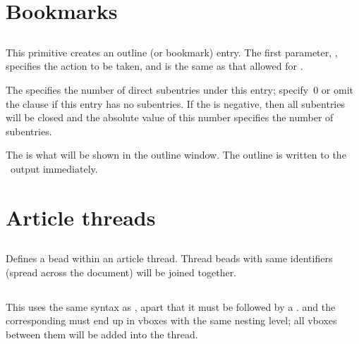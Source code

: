 \documentclass{pdftexmanual}
\begin{document}
\section{Bookmarks}

\subsection{}

This primitive creates an outline (or bookmark) entry. The first
parameter, , specifies the action to be taken, and
is the same as that allowed for \type{\pdfstartlink}.

The   specifies the number of direct
subentries under this entry; specify~0 or omit the clause if this entry
has no subentries. If the  is negative, then all
subentries will be closed and the absolute value of this number
specifies the number of subentries.

The  is what will be shown in the outline
window. The outline is written to the \PDF\ output immediately.

\section{Article threads}

\subsection{}

Defines a bead within an article thread. Thread beads with same
identifiers (spread across the document) will be joined together.

\subsection{}

This uses the same syntax as , apart that it must be
followed by a .   and the
corresponding  must end up in vboxes with the same
nesting level; all vboxes between them will be added into the thread.
\end{document}
